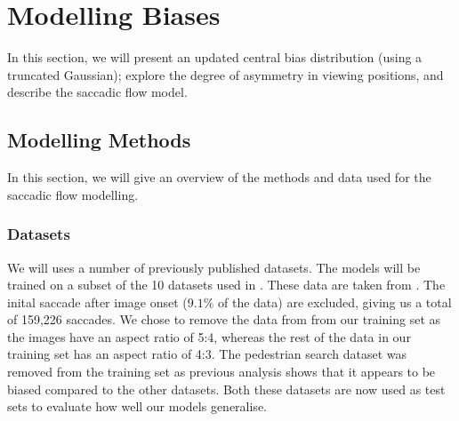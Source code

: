 \section{Modelling Biases}
\label{sec:biases}

In this section, we will present an updated central bias distribution (using a truncated Gaussian); explore the degree of asymmetry in viewing positions, and describe the saccadic flow model. 


\subsection{Modelling Methods}

In this section, we will give an overview of the methods and data used for the saccadic flow modelling.

\subsubsection{Datasets}

We will uses a number of previously published datasets. The models will be trained on a subset of the 10 datasets used in \cite{clarke-tatler2014}. These data are taken from \cite{clarke2013, tatler2005, tatler2007, yun2013, einhauser2008,judd2009}. The inital saccade after image onset ($9.1\%$ of the data) are excluded, giving us a total of 159,226 saccades. We chose to remove the data from \cite{asher2013} from our training set as the images have an aspect ratio of 5:4, whereas the rest of the data in our training set has an aspect ratio of 4:3. The pedestrian search dataset \citep{ehinger2009} was removed from the training set as previous analysis \citep{clarke-tatler2014} shows that it appears to be biased compared to the other datasets. Both these datasets are now used as test sets to evaluate how well our models generalise. 

